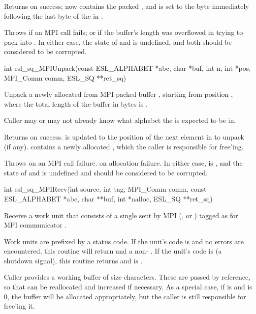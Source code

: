 \begin{sreapi}
Returns  on success;  now contains the
packed , and  is set to the byte
immediately following the last byte of the 
in . 

Throws  if an MPI call fails; or  if the
buffer's length  was overflowed in trying to pack
 into . In either case, the state of
 and  is undefined, and both should
be considered to be corrupted.


\hypertarget{func:esl_sq_MPIUnpack()}
{\item[int esl\_sq\_MPIUnpack(const ESL\_ALPHABET *abc, char *buf, int n, int *pos, MPI\_Comm comm, ESL\_SQ **ret\_sq)]}

Unpack a newly allocated  from MPI packed buffer
, starting from position , where the total length
of the buffer in bytes is . 

Caller may or may not already know what alphabet the 
is expected to be in.  

Returns  on success.  is updated to the position of
the next element in  to unpack (if any). 
contains a newly allocated , which the caller is
responsible for free'ing. 


Throws  on an MPI call failure.  on allocation failure.
In either case,  is , and the state of 
and  is undefined and should be considered to be corrupted.


\hypertarget{func:esl_sq_MPIRecv()}
{\item[int esl\_sq\_MPIRecv(int source, int tag, MPI\_Comm comm, const ESL\_ALPHABET *abc, char **buf, int *nalloc, ESL\_SQ **ret\_sq)]}

Receive a work unit that consists of a single 
sent by MPI  (, or
) tagged as  for MPI communicator .

Work units are prefixed by a status code. If the unit's
code is  and no errors are encountered, this
routine will return  and a non- .
If the unit's code is  (a shutdown signal), 
this routine returns  and  is .

Caller provides a working buffer  of size
 characters. These are passed by reference, so
that  can be reallocated and  increased
if necessary. As a special case, if  is  and
 is 0, the buffer will be allocated
appropriately, but the caller is still responsible for
free'ing it.


\end{sreapi}
